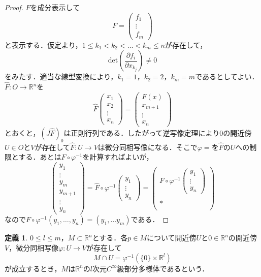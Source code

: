 ﻿\documentclass{jsarticle}
\theoremstyle{definition}
\newtheorem{definition}[theorem]{定義}
\newcommand{\euclid}[1]{\mathbb{R}^{#1}}
\begin{document}
\begin{proof}
$F$を成分表示して
\[ F=\begin{pmatrix} f_1 \\ \vdots \\ f_m \end{pmatrix} \]
と表示する．仮定より，$1\leq k_1 < k_2 < \dots < k_m \leq n$が存在して，
\[ \mathrm{det}\left(\frac{\partial f_i}{\partial x_{k_j}}\right) \neq 0 \]
をみたす．適当な線型変換により，$k_1=1$，$k_2=2$，$k_m=m$であるとしてよい．$\hat{F}\colon O\to \euclid{n}$を
\[ \hat{F}\begin{pmatrix} x_1 \\ x_2 \\ \vdots \\ x_n \end{pmatrix} = \begin{pmatrix} F(x) \\ x_{m+1} \\ \vdots \\ x_n \end{pmatrix} \]
とおくと，$(J\hat{F})_0$は正則行列である．したがって逆写像定理により0の開近傍$U\in O$と$V$が存在して$\hat{F}\colon U\to V$は微分同相写像になる．そこで$\varphi=$を$\hat{F}$の$U$への制限とする．あとは$F\circ \varphi^{-1}$を計算すればよいが，
\[ \begin{pmatrix} y_1 \\ \vdots　\\ y_m \\ y_{m+1} \\ \vdots \\ y_n \end{pmatrix} = \hat{F}\circ \varphi^{-1} \begin{pmatrix} y_1  \\ \vdots \\ y_n \end{pmatrix} 
= \begin{pmatrix} F\circ \varphi^{-1}\begin{pmatrix} y_1 \\ \vdots \\ y_n \end{pmatrix} \\ \\ \ast \\ \  \end{pmatrix} \]
 なので$F\circ \varphi^{-1}(y_1, \dots, y_n)=(y_1, \dots y_m)$である．
\end{proof}

\begin{definition}
$0\leq l \leq m$，$M\subset \euclid{n}$とする．各$p\in M$について開近傍$U$と$0\in \euclid{n}$の開近傍$V$，微分同相写像$\varphi\colon U\to V$が存在して
\[ M\cap U=\varphi^{-1}(\{0\}\times \euclid{l}) \]
が成立するとき，$M$は$\euclid{n}$の$l$次元$C^\infty$級部分多様体であるという．
\end{definition}
\end{document}
